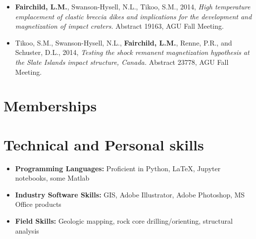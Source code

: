 \documentclass[11pt,a4paper,sans]{moderncv}        %
\begin{document}
\begin{itemize}
\item{\textbf{Fairchild, L.M.}, Swanson-Hysell, N.L., Tikoo, S.M., 2014, \textit{High temperature emplacement of clastic breccia dikes and implications for the development and magnetization of impact craters.} Abstract 19163, AGU Fall Meeting.}

\vspace{3pt}

\item{Tikoo, S.M., Swanson-Hysell, N.L., \textbf{Fairchild, L.M.}, Renne, P.R., and Schuster, D.L., 2014, \textit{Testing the shock remanent magnetization hypothesis at the Slate Islands impact structure, Canada.} Abstract 23778, AGU Fall Meeting.}

\end{itemize}

\section{Memberships}






\section{Technical and Personal skills}

\vspace{6pt}

\begin{itemize}

%

\item \textbf{Programming Languages:} Proficient in Python, LaTeX, Jupyter notebooks, some Matlab

\vspace{6pt}

\item \textbf{Industry Software Skills:} GIS, Adobe Illustrator, Adobe Photoshop, MS Office products

\vspace{6pt}

\item \textbf{Field Skills:} Geologic mapping, rock core drilling/orienting, structural analysis

\end{itemize}
\end{document}
